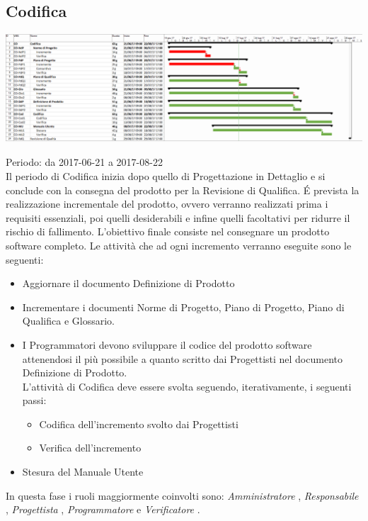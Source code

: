 \subsection{Codifica}

\begin{center}
  \includegraphics[scale=0.23]{img/5-CO.png}
\end{center}

Periodo: da 2017-06-21 a 2017-08-22 \\
Il periodo di Codifica inizia dopo quello di Progettazione in Dettaglio e si conclude
con la consegna del prodotto per la Revisione di Qualifica. 
\'E prevista la realizzazione incrementale del prodotto, ovvero verranno realizzati prima i requisiti essenziali, poi quelli desiderabili e infine quelli facoltativi per ridurre il rischio di fallimento.
L’obiettivo finale consiste nel consegnare un prodotto software completo. Le attività che ad ogni incremento verranno eseguite sono le seguenti:
\begin{itemize}
	\item Aggiornare il documento Definizione di Prodotto
	\item Incrementare i documenti Norme di Progetto, Piano di Progetto, Piano di Qualifica e Glossario.
	\item I Programmatori devono sviluppare il codice del prodotto software attenendosi il più possibile a quanto scritto dai Progettisti nel documento Definizione di Prodotto. \\
    L’attività di Codifica deve essere svolta seguendo, iterativamente, i seguenti passi:
    \begin{itemize}
    	\item Codifica dell’incremento svolto dai Progettisti
    	\item Verifica dell’incremento
	\end{itemize}
	\item Stesura del Manuale Utente
\end{itemize}

In questa fase i ruoli maggiormente coinvolti sono:  \emph{Amministratore} ,  \emph{Responsabile} ,
 \emph{Progettista} ,  \emph{Programmatore}  e  \emph{Verificatore} .

